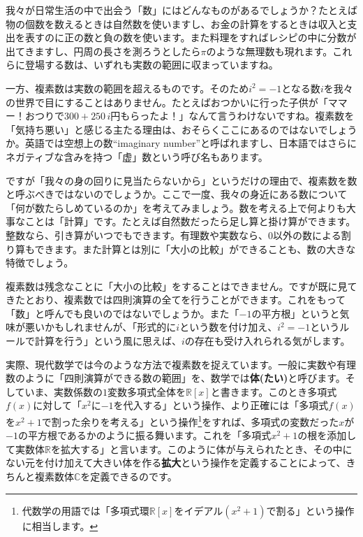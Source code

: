 我々が日常生活の中で出会う「数」にはどんなものがあるでしょうか？たとえば物の個数を数えるときは自然数を使いますし、お金の計算をするときは収入と支出を表すのに正の数と負の数を使います。また料理をすればレシピの中に分数が出てきますし、円周の長さを測ろうとしたら$\pi$のような無理数も現れます。これらに登場する数は、いずれも実数の範囲に収まっていますね。

一方、複素数は実数の範囲を超えるものです。そのため$i^2=-1$となる数$i$を我々の世界で目にすることはありません。たとえばおつかいに行った子供が「ママー！\negthinspace おつりで$300+250\,i$円もらったよ！」なんて言うわけないですね。複素数を「気持ち悪い」と感じる主たる理由は、おそらくここにあるのではないでしょうか。英語では空想上の数``imaginary number''と呼ばれますし、日本語ではさらにネガティブな含みを持つ「虚」数という呼び名もあります。

ですが「我々の身の回りに見当たらないから」というだけの理由で、複素数を数と呼ぶべきではないのでしょうか。ここで一度、我々の身近にある数について「何が数たらしめているのか」を考えてみましょう。数を考える上で何よりも大事なことは「計算」です。たとえば自然数だったら足し算と掛け算ができます。整数なら、引き算がいつでもできます。有理数や実数なら、$0$以外の数による割り算もできます。また計算とは別に「大小の比較」ができることも、数の大きな特徴でしょう。

複素数は残念なことに「大小の比較」をすることはできません。ですが既に見てきたとおり、複素数では四則演算の全てを行うことができます。これをもって「数」と呼んでも良いのではないでしょうか。また「$-1$の平方根」というと気味が悪いかもしれませんが、「形式的に$i$という数を付け加え、$i^2=-1$というルールで計算を行う」という風に思えば、$i$の存在も受け入れられる気がします。

実際、現代数学では今のような方法で複素数を捉えています。一般に実数や有理数のように「四則演算ができる数の範囲」を、数学では\textbf{体(たい)}と呼びます。そしていま、実数係数の$1$変数多項式全体を$\mathbb{R}[x]$と書きます。このとき多項式$f(x)$に対して「$x^2$に$-1$を代入する」という操作、より正確には「多項式$f(x)$を$x^2+1$で割った余りを考える」という操作\footnote{代数学の用語では「多項式環$\mathbb{R}[x]$をイデアル$(x^2+1)$で割る」という操作に相当します。}をすれば、多項式の変数だった$x$が$-1$の平方根であるかのように振る舞います。これを「多項式$x^2+1$の根を添加して実数体$\mathbb{R}$を拡大する」と言います。このように体が与えられたとき、その中にない元を付け加えて大きい体を作る\textbf{拡大}という操作を定義することによって、きちんと複素数体$\mathbb{C}$を定義できるのです。

